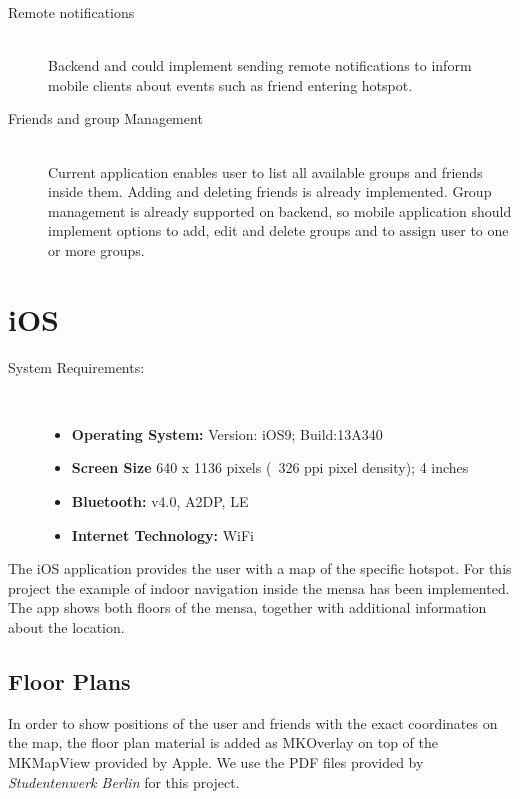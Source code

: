 \begin{description}
  \item[Remote notifications] \hfill \\
  Backend and could implement sending remote notifications to inform mobile clients about events such as friend entering hotspot.
  \item[Friends and group Management] \hfill \\
  Current application enables user to list all available groups and friends inside them. Adding and deleting friends is already implemented. Group management is already supported on backend, so mobile application should implement options to add, edit and delete groups and to assign user to one or more groups.

\end{description}
\pagebreak


\section{iOS}

\begin{description}
\item[System Requirements:] \hfill \\
\begin{itemize}
  \item \textbf{Operating System:} Version: iOS9; Build:13A340
  \item \textbf{Screen Size} 640 x 1136 pixels (~326 ppi pixel density); 4 inches
  \item \textbf{Bluetooth:} v4.0, A2DP, LE
  \item \textbf{Internet Technology:} WiFi
\end{itemize}
\end{description}

The iOS application provides the user with a map of the specific hotspot. For this project the example of indoor navigation inside the mensa has been implemented. The app shows both floors of the mensa, together with additional information about the location.

\subsection{Floor Plans}
In order to show positions of the user and friends with the exact coordinates on the map, the floor plan material is added as MKOverlay on top of the MKMapView provided by Apple. We use the PDF files provided by \textit{Studentenwerk Berlin} for this project.

